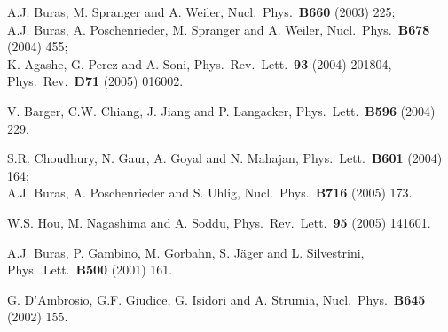 \documentclass[12pt]{article}
\begin{document}
\begin{thebibliography}{999}
A.J. Buras, M. Spranger and A. Weiler,
  { Nucl.\ Phys.}~{\bf B660} (2003) 225;\\
  A.J. Buras, A. Poschenrieder, M. Spranger and A. Weiler,
 {  Nucl.\ Phys.}~{\bf B678} (2004) 455;\\
  K. Agashe, G. Perez and A. Soni,
  { Phys.\ Rev.\ Lett.}~{\bf 93} (2004) 201804,
  { Phys.\ Rev.}~{\bf D71} (2005) 016002.

V. Barger, C.W. Chiang, J. Jiang and P. Langacker,
  { Phys.\ Lett.}~{\bf B596} (2004) 229.

S.R. Choudhury, N. Gaur, A. Goyal and N. Mahajan,
  { Phys.\ Lett.}~{\bf B601} (2004) 164;\\
  A.J. Buras, A. Poschenrieder and S. Uhlig,
 { Nucl.\ Phys.}~{\bf B716} (2005) 173.

  W.S. Hou, M. Nagashima and A. Soddu,
  { Phys.\ Rev.\ Lett.}~{\bf 95} (2005) 141601.
  
A.J. Buras, P. Gambino, M. Gorbahn, S. J\"ager and L. Silvestrini,
  { Phys.\ Lett.}~{\bf B500} (2001) 161.

G. D'Ambrosio, G.F. Giudice, G. Isidori and A. Strumia,
  { Nucl.\ Phys.}~{\bf B645} (2002) 155.
  

\end{thebibliography}
\end{document}
